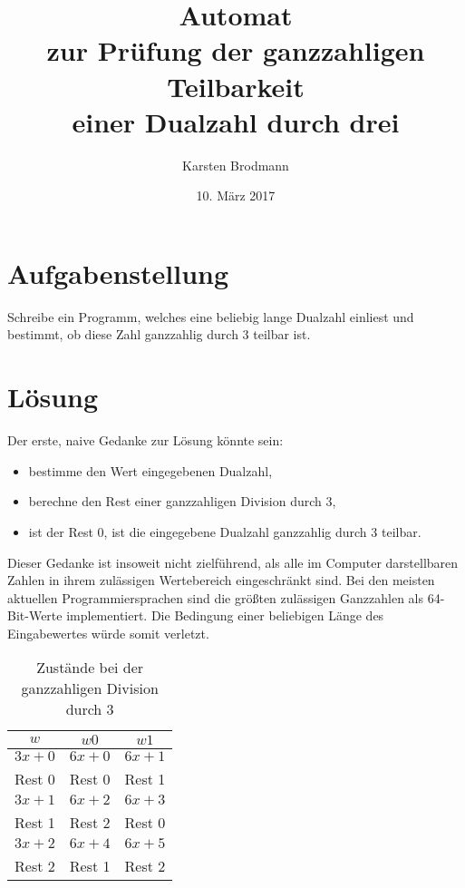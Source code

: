 \documentclass[draft=false]{scrartcl}
\begin{document}
\title{Automat \\
zur Prüfung der ganzzahligen Teilbarkeit \\
einer Dualzahl durch drei}
\author{Karsten Brodmann}
\date{10. März 2017}
\maketitle

\section{Aufgabenstellung} 

Schreibe ein Programm, welches eine beliebig lange Dualzahl einliest und bestimmt, ob diese Zahl ganzzahlig durch 3 teilbar ist.

\section{Lösung} 

Der erste, naive Gedanke zur Lösung könnte sein:

\begin{itemize} 
\item bestimme den Wert eingegebenen Dualzahl, 
\item berechne den Rest einer ganzzahligen Division durch 3, 
\item ist der Rest 0, ist die eingegebene Dualzahl ganzzahlig durch 3
      teilbar.
\end{itemize}

Dieser Gedanke ist insoweit nicht zielführend, als alle im Computer darstellbaren Zahlen in ihrem zulässigen Wertebereich eingeschränkt sind. Bei den meisten aktuellen Programmiersprachen sind die größten zulässigen Ganzzahlen als 64-Bit-Werte implementiert. Die Bedingung einer beliebigen Länge des Eingabewertes würde somit verletzt.

\begin{table}[!htbp] \begin{center} \begin{tabular}{|c|c|c|} 
\hline
 $w$ & $w0$ & $w1$ \\
\hline 
\hline 
$3x+0$ & $6x+0$ & $6x+1$                                   \\ 
Rest 0 & Rest 0 & Rest 1                                   \\ 
\hline 
$3x+1$ & $6x+2$ & $6x+3$                                   \\ 
Rest 1 & Rest 2 & Rest 0                                   \\
\hline 
$3x+2$ & $6x+4$ & $6x+5$                                   \\ 
Rest 2 & Rest 1 & Rest 2                                   \\ 
\hline
\end{tabular}\end{center}
	\caption{Zustände bei der ganzzahligen Division durch 3}
	\label{tab:zustaende}
\end{table}
\end{document}
